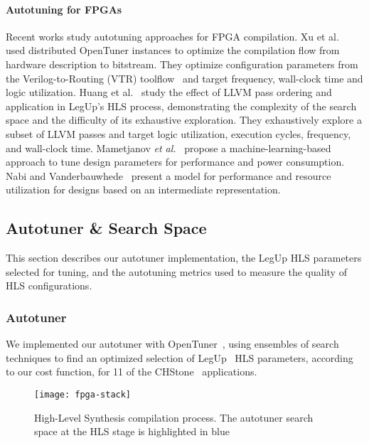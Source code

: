 \paragraph{Autotuning for FPGAs}

Recent works study autotuning approaches for FPGA compilation.  Xu et
al.~\cite{xu2017parallel} used distributed OpenTuner instances to optimize the
compilation flow from hardware description to bitstream.  They optimize
configuration parameters from the Verilog-to-Routing (VTR)
toolflow~\cite{luu2014vtr} and target frequency, wall-clock time and logic
utilization.  Huang et al.~\cite{huang2015effect} study the effect of LLVM pass
ordering and application in LegUp's HLS process, demonstrating the complexity
of the search space and the difficulty of its exhaustive exploration.  They
exhaustively explore a subset of LLVM passes and target logic utilization,
execution cycles, frequency, and wall-clock time.  Mametjanov \emph{et
al.}~\cite{mametjanov2015autotuning} propose a machine-learning-based approach
to tune design parameters for performance and power consumption.  Nabi and
Vanderbauwhede~\cite{nabi2016fast} present a model for performance and resource
utilization for designs based on an intermediate representation.

\subsection{Autotuner \& Search Space}

This section describes our autotuner implementation, the LegUp HLS parameters
selected for tuning, and the autotuning metrics used to measure the quality of
HLS configurations.

\subsubsection{Autotuner}

We implemented our autotuner with OpenTuner~\cite{ansel2014opentuner}, using
ensembles of search techniques to find an optimized selection of
LegUp~\cite{canis2015legup} HLS parameters, according to our cost function, for
11 of the CHStone~\cite{hara2008chstone} applications.

\begin{figure}[htpb]
    \centering
    \texttt{[image: fpga-stack]}
    \caption{High-Level Synthesis compilation process. The autotuner search space at the HLS stage is highlighted in blue}
    \label{fig:fpga-stack}
\end{figure}

